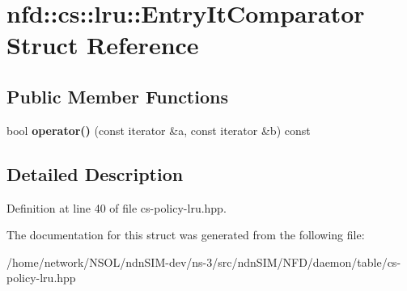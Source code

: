 \hypertarget{structnfd_1_1cs_1_1lru_1_1EntryItComparator}{}\section{nfd\+:\+:cs\+:\+:lru\+:\+:Entry\+It\+Comparator Struct Reference}
\label{structnfd_1_1cs_1_1lru_1_1EntryItComparator}
\subsection*{Public Member Functions}
\begin{DoxyCompactItemize}
\item 
bool {\bfseries operator()} (const iterator \&a, const iterator \&b) const\hypertarget{structnfd_1_1cs_1_1lru_1_1EntryItComparator_adb59afc0163ac37e8f1abe03af98cb77}{}\label{structnfd_1_1cs_1_1lru_1_1EntryItComparator_adb59afc0163ac37e8f1abe03af98cb77}

\end{DoxyCompactItemize}


\subsection{Detailed Description}


Definition at line 40 of file cs-\/policy-\/lru.\+hpp.



The documentation for this struct was generated from the following file\+:\begin{DoxyCompactItemize}
\item 
/home/network/\+N\+S\+O\+L/ndn\+S\+I\+M-\/dev/ns-\/3/src/ndn\+S\+I\+M/\+N\+F\+D/daemon/table/cs-\/policy-\/lru.\+hpp\end{DoxyCompactItemize}
